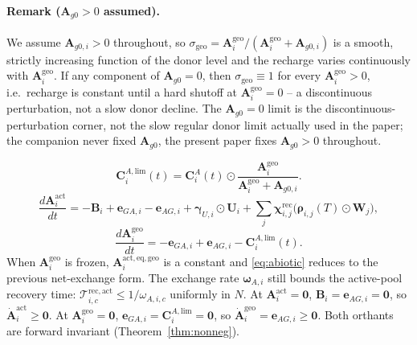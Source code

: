 \documentclass[11pt]{article}
\theoremstyle{definition}
\begin{document}
\paragraph{Remark ($\mathbf A_{g0}>0$ assumed).} We assume $\mathbf A_{g0,i}>0$ throughout, so $\sigma_{\mathrm{geo}}=\mathbf A^{\mathrm{geo}}_i/(\mathbf A^{\mathrm{geo}}_i+\mathbf A_{g0,i})$ is a smooth, strictly increasing function of the donor level and the recharge varies continuously with $\mathbf A^{\mathrm{geo}}_i$. If any component of $\mathbf A_{g0}=0$, then $\sigma_{\mathrm{geo}}\equiv 1$ for every $\mathbf A^{\mathrm{geo}}_i>0$, i.e.~recharge is constant until a hard shutoff at $\mathbf A^{\mathrm{geo}}_i=0$ -- a discontinuous perturbation, not a slow donor decline. The $\mathbf A_{g0}=0$ limit is the discontinuous-perturbation corner, not the slow regular donor limit actually used in the paper; the companion never fixed $\mathbf A_{g0}$, the present paper fixes $\mathbf A_{g0}>0$ throughout.

\begin{equation}
\mathbf C^{A,\mathrm{lim}}_i(t)=\mathbf C^A_i(t)\odot\frac{\mathbf A^{\mathrm{geo}}_i}{\mathbf A^{\mathrm{geo}}_i+\mathbf A_{g0,i}}.
\label{eq:mining-limited}
\end{equation}
\begin{equation}
\frac{d\mathbf A^{\mathrm{act}}_i}{dt}
= -\mathbf B_i + \mathbf e_{GA,i}-\mathbf e_{AG,i}
+ \boldsymbol\gamma_{U,i}\odot\mathbf U_i
+ \sum_j\boldsymbol\chi^{\mathrm{rec}}_{i,j}\bigl(\boldsymbol\rho_{i,j}(T)\odot\mathbf W_j\bigr),
\label{eq:abiotic}
\end{equation}
\begin{equation}
\frac{d\mathbf A^{\mathrm{geo}}_i}{dt}
= -\mathbf e_{GA,i}+\mathbf e_{AG,i} - \mathbf C^{A,\mathrm{lim}}_i(t).
\label{eq:abiotic-geo}
\end{equation}
When $\mathbf A^{\mathrm{geo}}_i$ is frozen, $\mathbf A^{\mathrm{act,eq,geo}}_i$ is a constant and \eqref{eq:abiotic} reduces to the previous net-exchange form. The exchange rate $\boldsymbol\omega_{A,i}$ still bounds the active-pool recovery time: $\mathcal T^{\mathrm{rec,act}}_{i,c}\le 1/\omega_{A,i,c}$ uniformly in $N$. At $\mathbf A^{\mathrm{act}}_i=\mathbf 0$, $\mathbf B_i=\mathbf e_{AG,i}=\mathbf 0$, so $\dot{\mathbf A}^{\mathrm{act}}_i\ge\mathbf 0$. At $\mathbf A^{\mathrm{geo}}_i=\mathbf 0$, $\mathbf e_{GA,i}=\mathbf C^{A,\mathrm{lim}}_i=\mathbf 0$, so $\dot{\mathbf A}^{\mathrm{geo}}_i=\mathbf e_{AG,i}\ge\mathbf 0$. Both orthants are forward invariant (Theorem~\ref{thm:nonneg}).
\end{document}
